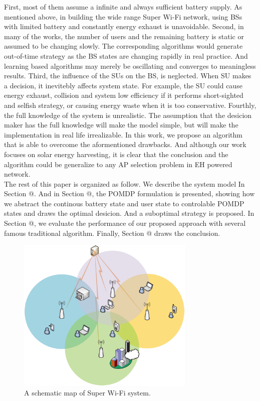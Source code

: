 \documentclass[conference]{IEEEtran}
\makeatletter
\newcommand{\Rmnum}[1]{\expandafter\@slowromancap\romannumeral #1@}
\makeatother
\begin{document}
First, most of them assume a infinite and always sufficient battery supply.
As mentioned above, in building the wide range Super Wi-Fi network, 
using BSs with limited battery and constantly energy exhaust is unavoidable.
Second, in many of the works, 
the number of users and the remaining battery is static or assumed to be changing slowly.
The corresponding algorithms would generate out-of-time strategy as the BS states are changing rapidly in real practice.
And learning based algorithms may merely be oscillating and converges to meaningless results.
Third, the influence of the SUs on the BS, is neglected.
When SU makes a decision, it inevitebly affects system state. 
For example, the SU could cause energy exhaust, 
collision and system low efficiency if it performs short-sighted and selfish strategy,
or causing energy waste when it is too conservative.
Fourthly, the full knowledge of the system is unrealistic.
The assumption that the desicion maker has the full knowledge will make the model simple,
but will make the implementation in real life irrealizable.
In this work, we propose an algorithm that is able to overcome the aformentioned drawbacks.
And although our work focuses on solar energy harvesting,
it is clear that the conclusion and the algorithm could be generalize to any AP selection problem in EH powered network.
\\
\indent The rest of this paper is organized as follow.
We describe the system model In Section \Rmnum{2}.
And in Section \Rmnum{3}, the POMDP formulation is presented,
showing how we abstract the continous battery state and user state to
controlable POMDP states and draws the optimal desicion. And a suboptimal strategy is proposed.
In Section \Rmnum{4}, we evaluate the performance of our proposed approach with several famous traditional algorithm.
Finally, Section \Rmnum{5} draws the conclusion.
\begin{figure}
\centering
\includegraphics[width=8.5cm]{Fig1.eps}
\caption{A schematic map of Super Wi-Fi system.}
\end{figure}
\end{document}
